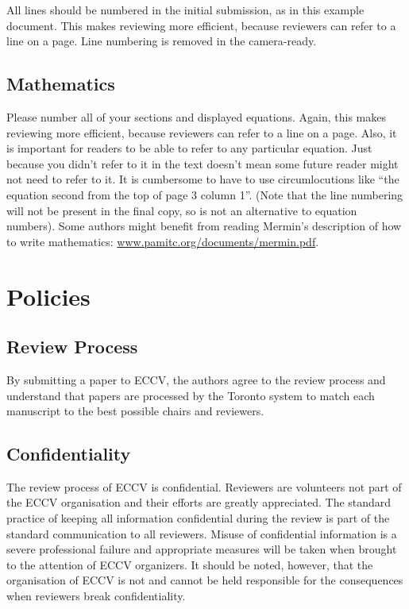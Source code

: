 \documentclass[runningheads]{llncs}
\begin{document}

All lines should be numbered in the initial submission, as in this example document. This makes reviewing more efficient, because reviewers can refer to a line on a page. Line numbering is removed in the camera-ready.


\subsection{Mathematics}

Please number all of your sections and displayed equations.  Again,
this makes reviewing more efficient, because reviewers can refer to a
line on a page.  Also, it is important for readers to be able to refer
to any particular equation.  Just because you didn't refer to it in
the text doesn't mean some future reader might not need to refer to
it.  It is cumbersome to have to use circumlocutions like ``the
equation second from the top of page 3 column 1''.  (Note that the
line numbering will not be present in the final copy, so is not an
alternative to equation numbers).  Some authors might benefit from
reading Mermin's description of how to write mathematics:
\url{www.pamitc.org/documents/mermin.pdf}.
\section{Policies}
\subsection{Review Process}
By submitting a paper to ECCV, the authors agree to the review process and understand that papers are processed by the Toronto system to match each manuscript to the best possible chairs and reviewers.
\subsection{Confidentiality}
The review process of ECCV is confidential. Reviewers are volunteers not part of the ECCV organisation and their efforts are greatly appreciated. The standard practice of keeping all information confidential during the review is part of the standard communication to all reviewers. Misuse of confidential information is a severe professional failure and  appropriate measures will be taken when brought to the attention of ECCV organizers. It should be noted, however, that the organisation of ECCV is not and cannot be held responsible for the consequences when reviewers break confidentiality.
\end{document}

